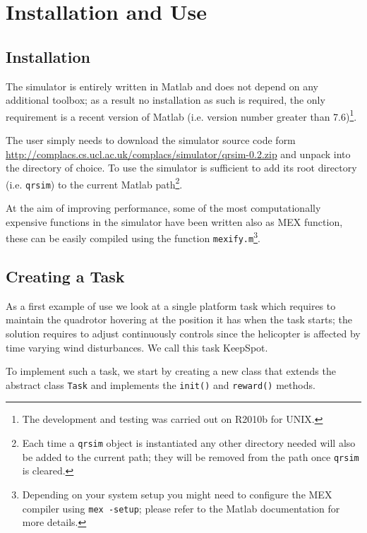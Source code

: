 \documentclass[a4paper,11pt]{report}
\newcommand{\web}{\url{http://complacs.cs.ucl.ac.uk/complacs/simulator/qrsim-0.2.zip}\xspace}
\begin{document}
\chapter{Installation and Use}

\section{Installation}
The simulator is entirely written in Matlab and does not depend on any additional toolbox; as a result no installation as such is required, the only requirement is a recent version of Matlab (i.e. version number greater  than 7.6)\footnote{The development and testing was carried out on R2010b for UNIX.}.

The user simply needs to download the simulator source code form \web and unpack into the directory of choice.
To use the simulator is sufficient to add its root directory (i.e. \texttt{qrsim}) to the current Matlab path\footnote{Each time a \texttt{qrsim} object is instantiated any other directory needed will also be added to the current path; they will be removed from the path once  \texttt{qrsim} is cleared.}.

At the aim of improving performance, some of the most computationally expensive functions in the simulator have been written also as MEX function, these can be easily compiled using the function \texttt{mexify.m}\footnote{Depending on your system setup you might need to configure the MEX compiler using \texttt{mex -setup}; please refer to the Matlab documentation for more details.}.


\section{Creating a Task}  \label{sec:createtask}

As a first example of use we look at a single platform task which requires to maintain the quadrotor hovering at the position it has when the task starts; the solution requires to adjust continuously controls since the helicopter is affected by time varying wind disturbances. We call this task KeepSpot. 
 
To implement such a task, we start by creating a new class that extends the abstract class \texttt{Task} and implements the \texttt{init()} and \texttt{reward()} methods.
\end{document}
